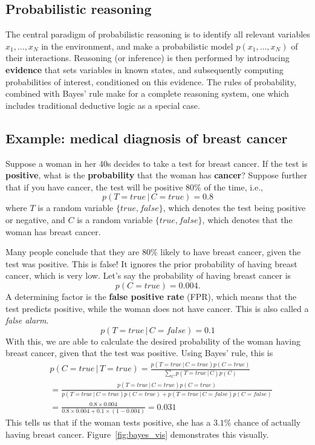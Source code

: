 \documentclass{article}
\begin{document}
\subsection{Probabilistic reasoning}

The central paradigm of probabilistic reasoning is to identify all relevant variables $x_1, \dots, x_N$ in the environment, and make a probabilistic model $p(x_1, \dots, x_N)$ of their interactions. Reasoning (or inference) is then performed by introducing \textbf{evidence} that sets variables in known states, and subsequently computing probabilities of interest, conditioned on this evidence. The rules of probability, combined with Bayes' rule make for a complete reasoning system, one which includes traditional deductive logic as a special case.

\subsection{Example: medical diagnosis of breast cancer}

Suppose a woman in her 40s decides to take a test for breast cancer. If the test is \textbf{positive}, what is the \textbf{probability} that the woman has \textbf{cancer}? 
Suppose further that if you have cancer, the test will be positive $80\%$ of the time, i.e., 
$$
    p(T=true \,|\, C=true) = 0.8
$$
where $T$ is a random variable $\{true, false\}$, which denotes the test being positive or negative, and $C$ is a random variable $\{true, false\}$, which denotes that the woman has breast cancer.

Many people conclude that they are $80\%$ likely to have breast cancer, given the test was positive. This is false! It ignores the prior probability of having breast cancer, which is very low. Let's say the probability of having breast cancer is
$$
    p(C=true) = 0.004 .
$$
A determining factor is the \textbf{false positive rate} (FPR), which means that the test predicts positive, while the woman does not have cancer. This is also called a \textit{false alarm}.
$$
    p(T=true \,|\, C = false) = 0.1
$$
With this, we are able to calculate the desired probability of the woman having breast cancer, given that the test was positive. Using Bayes' rule, this is 
\begin{align*}
    &p(C = true \,|\, T = true) = \frac{p(T = true \,|\, C = true)p(C = true)}{\sum_{C} p(T = true \,|\, C)p(C)} \\[.5em]
    &= \frac{p(T = true \,|\, C = true)p(C = true)}{p(T = true \,|\, C = true)p(C = true) + p(T = true \,|\, C = false)p(C = false)} \\[.5em]
    &= \frac{0.8 \times 0.004}{0.8 \times 0.004 + 0.1 \times (1 - 0.004)} = 0.031
\end{align*}
This tells us that if the woman tests positive, she has a $3.1\%$ chance of actually having breast cancer. Figure~\ref{fig:bayes_vis} demonstrates this visually. 
\end{document}
